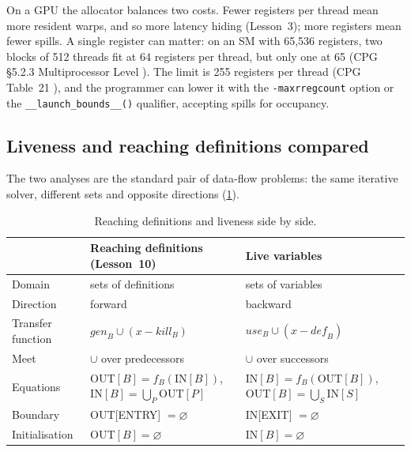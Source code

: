 \documentclass[../main.tex]{subfiles}
\begin{document}
On a GPU the allocator balances two costs.  Fewer registers per thread
mean more resident warps, and so more latency hiding (Lesson~3); more
registers mean fewer spills.  A single register can matter: on an SM
with 65,536 registers, two blocks of 512 threads fit at 64 registers per
thread, but only one at 65 (CPG §5.2.3 Multiprocessor Level
\cite{nvidia2024cudaguide}).
The limit is 255 registers per thread (CPG Table~21
\cite{nvidia2024cudaguide}), and the programmer can
lower it with the \texttt{-maxrregcount} option or the
\texttt{\_\_launch\_bounds\_\_()} qualifier, accepting spills for
occupancy.

\subsection{Liveness and reaching definitions compared}

The two analyses are the standard pair of data-flow problems: the same
iterative solver, different sets and opposite directions
(\cref{tab:l11-compare}).

\begin{table}[tb]
  \centering\small
  \begin{tabular}{@{}>{\raggedright\arraybackslash}p{24mm}
                    >{\raggedright\arraybackslash}p{42mm}
                    >{\raggedright\arraybackslash}p{42mm}@{}}
    \toprule
    & Reaching definitions (Lesson~10) & Live variables \\
    \midrule
    Domain & sets of definitions & sets of variables \\
    Direction & forward & backward \\
    Transfer function & $\mathit{gen}_B \cup (x - \mathit{kill}_B)$ &
      $\mathit{use}_B \cup (x - \mathit{def}_B)$ \\
    Meet & $\cup$ over predecessors & $\cup$ over successors \\
    Equations & OUT$[B] = f_B(\mathrm{IN}[B])$, IN$[B] = \bigcup_{P}
      \mathrm{OUT}[P]$ & IN$[B] = f_B(\mathrm{OUT}[B])$, OUT$[B] =
      \bigcup_{S} \mathrm{IN}[S]$ \\
    Boundary & OUT[ENTRY] $= \varnothing$ & IN[EXIT] $= \varnothing$ \\
    Initialisation & OUT$[B] = \varnothing$ & IN$[B] = \varnothing$ \\
    \bottomrule
  \end{tabular}
  \caption{Reaching definitions and liveness side by side.}
  \label{tab:l11-compare}
\end{table}
\end{document}
